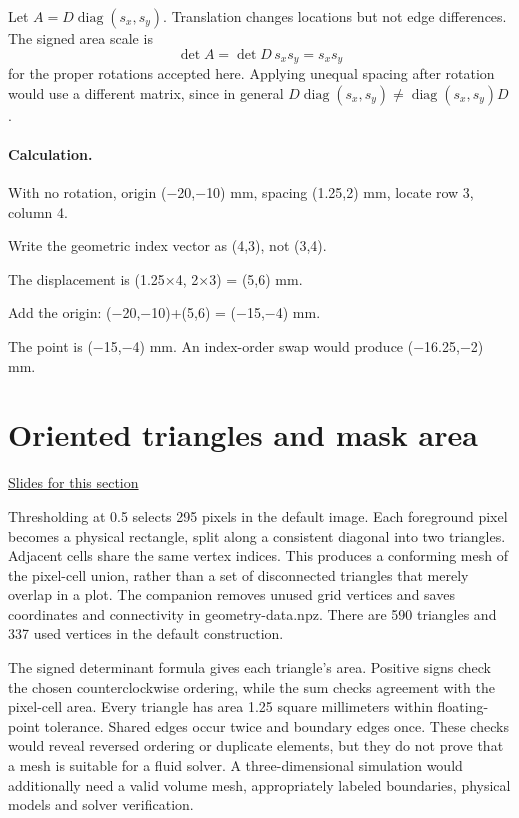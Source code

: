 \documentclass[11pt,letterpaper]{article}
\theoremstyle{definition}\newtheorem{definition}{Definition}\newtheorem{example}{Example}
\numberwithin{equation}{section}
\begin{document}
Let $A=D\operatorname{diag}(s_x,s_y)$. Translation changes locations but not edge differences. The signed area scale is
\[
 \det A=\det D\,s_xs_y=s_xs_y
\]
for the proper rotations accepted here. Applying unequal spacing after rotation would use a different matrix, since in general $D\operatorname{diag}(s_x,s_y)\ne\operatorname{diag}(s_x,s_y)D$.

\paragraph{Calculation.} With no rotation, origin (\ensuremath{-}20,\ensuremath{-}10) mm, spacing (1.25,2) mm, locate row 3, column 4.

Write the geometric index vector as (4,3), not (3,4).

The displacement is (1.25\ensuremath{\times}4, 2\ensuremath{\times}3) = (5,6) mm.

Add the origin: (\ensuremath{-}20,\ensuremath{-}10)+(5,6) = (\ensuremath{-}15,\ensuremath{-}4) mm.

The point is (\ensuremath{-}15,\ensuremath{-}4) mm. An index-order swap would produce (\ensuremath{-}16.25,\ensuremath{-}2) mm.
\section{Oriented triangles and mask area}
\hypertarget{note-oriented-triangles-and-mask-area}{}\label{note:oriented-triangles-and-mask-area}
{\small \href{slides.html\#frame=triangulating-the-selected-cells-panel-1\&step=1}{Slides for this section}}\par
Thresholding at 0.5 selects 295 pixels in the default image. Each foreground pixel becomes a physical rectangle, split along a consistent diagonal into two triangles. Adjacent cells share the same vertex indices. This produces a conforming mesh of the pixel-cell union, rather than a set of disconnected triangles that merely overlap in a plot. The companion removes unused grid vertices and saves coordinates and connectivity in geometry-data.npz. There are 590 triangles and 337 used vertices in the default construction.

The signed determinant formula gives each triangle's area. Positive signs check the chosen counterclockwise ordering, while the sum checks agreement with the pixel-cell area. Every triangle has area 1.25 square millimeters within floating-point tolerance. Shared edges occur twice and boundary edges once. These checks would reveal reversed ordering or duplicate elements, but they do not prove that a mesh is suitable for a fluid solver. A three-dimensional simulation would additionally need a valid volume mesh, appropriately labeled boundaries, physical models and solver verification.
\end{document}
